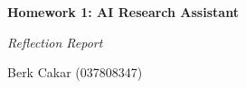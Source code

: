 \thispagestyle{fancy}
\vspace*{1em}
\begin{center}
{\sffamily\bfseries\color{ece}\Large Homework 1: AI Research Assistant\par}
\vspace{0.4em}
{\sffamily\itshape\color{ece}\Large Reflection Report\par}
\vspace{0.6em}
{\sffamily\color{hdrgrey}Berk Cakar (037808347)\par}
\end{center}
\vspace{1.5em}
